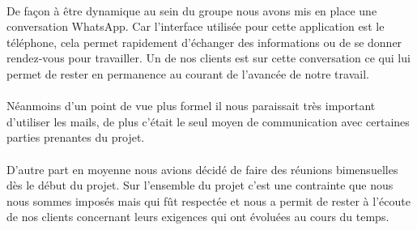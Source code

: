    \paragraph{}
    De façon à être dynamique au sein du groupe nous avons mis en place une conversation WhatsApp. Car l'interface utilisée pour cette application est le téléphone, cela permet rapidement d'échanger des informations ou de se donner rendez-vous pour travailler. Un de nos clients est sur cette conversation ce qui lui permet de rester en permanence au courant de l'avancée de notre travail.
    \paragraph{}
    Néanmoins d'un point de vue plus formel il nous paraissait très important d'utiliser les mails, de plus c'était le seul moyen de communication avec certaines parties prenantes du projet.
    \paragraph{}
    D'autre part en moyenne nous avions décidé de faire des réunions bimensuelles dès le début du projet. Sur l'ensemble du projet c'est une contrainte que nous nous sommes imposés mais qui fût respectée et nous a permit de rester à l'écoute de nos clients concernant leurs exigences qui ont évoluées au cours du temps.